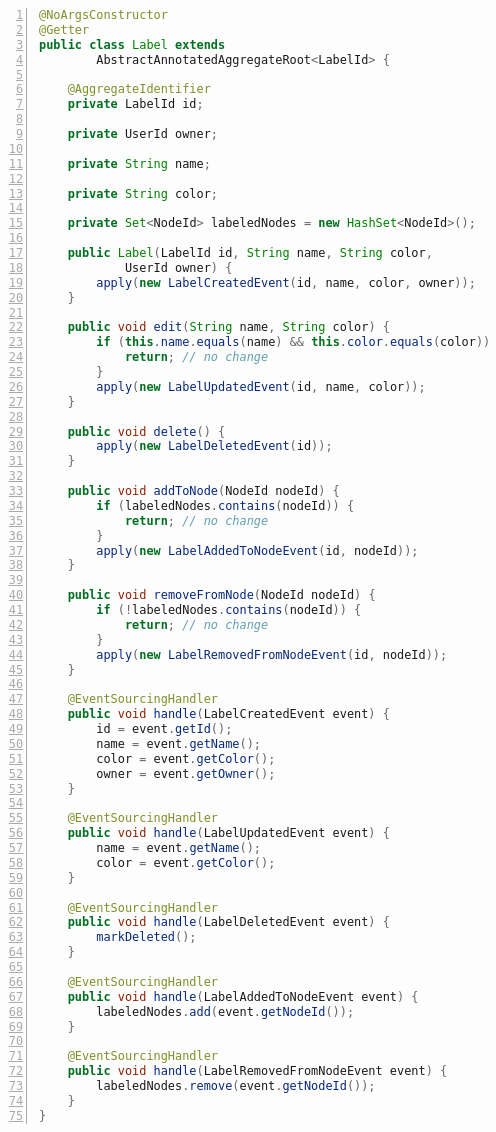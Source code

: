\documentclass[11pt,twoside,a4paper]{book}
\begin{document}
\begin{lstlisting}[caption={The \texttt{Label} aggregate source code},label={lst:labelAggregate},
language=java,
numbers=left,
breaklines=true]
@NoArgsConstructor
@Getter
public class Label extends
        AbstractAnnotatedAggregateRoot<LabelId> {

    @AggregateIdentifier
    private LabelId id;

    private UserId owner;

    private String name;

    private String color;

    private Set<NodeId> labeledNodes = new HashSet<NodeId>();

    public Label(LabelId id, String name, String color,
            UserId owner) {
        apply(new LabelCreatedEvent(id, name, color, owner));
    }

    public void edit(String name, String color) {
        if (this.name.equals(name) && this.color.equals(color)){
            return; // no change
        }
        apply(new LabelUpdatedEvent(id, name, color));
    }

    public void delete() {
        apply(new LabelDeletedEvent(id));
    }

    public void addToNode(NodeId nodeId) {
        if (labeledNodes.contains(nodeId)) {
            return; // no change
        }
        apply(new LabelAddedToNodeEvent(id, nodeId));
    }

    public void removeFromNode(NodeId nodeId) {
        if (!labeledNodes.contains(nodeId)) {
            return; // no change
        }
        apply(new LabelRemovedFromNodeEvent(id, nodeId));
    }

    @EventSourcingHandler
    public void handle(LabelCreatedEvent event) {
        id = event.getId();
        name = event.getName();
        color = event.getColor();
        owner = event.getOwner();
    }

    @EventSourcingHandler
    public void handle(LabelUpdatedEvent event) {
        name = event.getName();
        color = event.getColor();
    }

    @EventSourcingHandler
    public void handle(LabelDeletedEvent event) {
        markDeleted();
    }

    @EventSourcingHandler
    public void handle(LabelAddedToNodeEvent event) {
        labeledNodes.add(event.getNodeId());
    }

    @EventSourcingHandler
    public void handle(LabelRemovedFromNodeEvent event) {
        labeledNodes.remove(event.getNodeId());
    }
}
\end{lstlisting}
\end{document}
